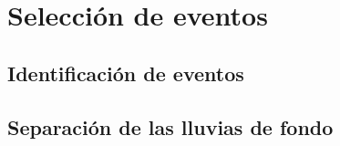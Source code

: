 \chapter{Selecci\'on de eventos}

\section{Identificaci\'on de eventos}

\section{Separaci\'on de las lluvias de fondo}